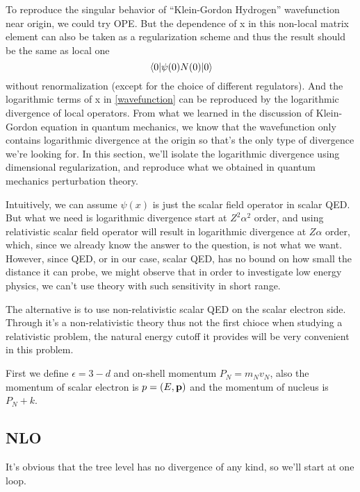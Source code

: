\documentclass{article}
\newcommand{\vbp}{\vb{p}}
\renewcommand{\a}{\alpha}
\begin{document}
To reproduce the singular behavior of ``Klein-Gordon Hydrogen'' wavefunction near origin, we could try OPE. But the dependence of x in this non-local matrix element can also be taken as a regularization scheme and thus the result should be the same as local one
$$\mel{0}{\psi(0)N(0)}{0}$$
without renormalization (except for the choice of different regulators). And the logarithmic terms of x in \eqref{wavefunction} can be reproduced by the logarithmic divergence of local operators. From what we learned in the discussion of Klein-Gordon equation in quantum mechanics, we know that the wavefunction only contains logarithmic divergence at the origin so that's the only type of divergence we're looking for. In this section, we'll isolate the logarithmic divergence using dimensional regularization, and reproduce what we obtained in quantum mechanics perturbation theory. 

Intuitively, we can assume $\psi(x)$ is just the scalar field operator in scalar QED. But what we need is logarithmic divergence start at $Z^2\a^2$ order, and using relativistic scalar field operator will result in logarithmic divergence at $Z\a$ order, which, since we already know the answer to the question, is not what we want. However, since QED, or in our case, scalar QED, has no bound on how small the distance it can probe, we might observe that in order to investigate low energy physics, we can't use theory with such sensitivity in short range.

The alternative is to use non-relativistic scalar QED on the scalar electron side. Through it's a non-relativistic theory thus not the first chioce when studying a relativistic problem, the natural energy cutoff it provides will be very convenient in this problem.

First we define $\epsilon=3-d$ and on-shell momentum $P_N=m_Nv_N$, also the momentum of scalar electron is $p=(E,\vbp)$ and the momentum of nucleus is $P_N+k$.
\subsection{NLO}
It's obvious that the tree level has no divergence of any kind, so we'll start at one loop.
\end{document}
